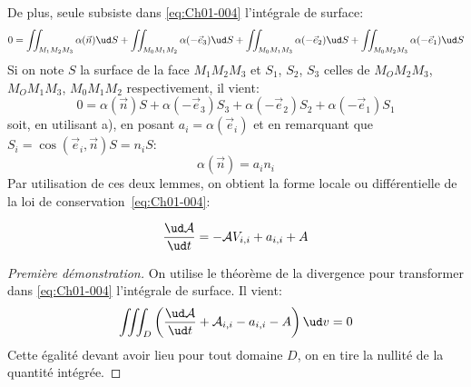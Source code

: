 De plus, seule subsiste dans \eqref{eq:Ch01-004} l'intégrale de surface:
\begin{equation*}
    0=\iint_{M_1M_2M_3}\alpha(\vec{n}) \ud S+\iint_{M_0M_1M_2}\alpha(-\vec{e}_3) \ud S+ \iint_{M_0M_1M_3}\alpha(-\vec{e}_2) \ud S+\iint_{M_0M_2M_3}\alpha(-\vec{e}_1) \ud S
\end{equation*}
Si on note $S$ la surface de la face $M_1M_2M_3$ et $S_1$, $S_2$, $S_3$ celles de $M_OM_2M_3$, $M_OM_1M_3$, $M_0M_1M_2$ respectivement, il vient:
\begin{equation*}
    0 = \alpha(\vec{n})S+\alpha(-\vec{e}_3)S_3+\alpha(-\vec{e}_2)S_2+\alpha(-\vec{e}_1)S_1
\end{equation*}
soit, en utilisant a), en posant $a_i=\alpha(\vec{e}_i)$ et en remarquant que $S_i=\cos(\vec{e}_i,\vec{n})S=n_iS$:
\begin{equation*}
    \alpha(\vec{n})=a_in_i
\end{equation*}
Par utilisation de ces deux lemmes, on obtient la forme locale ou différentielle de la loi de conservation~\eqref{eq:Ch01-004}:
\begin{thm}
    \begin{equation}
        \frac{\ud \mathcal{A}}{\ud t} = -\mathcal{A}V_{i,i} + a_{i,i} + A
        \label{eq:Ch01-008}
    \end{equation}
    \label{thm:Ch01-1}
\end{thm}
\begin{proof}[Première démonstration]
    On utilise le théorème de la divergence pour transformer dans \eqref{eq:Ch01-004} l'intégrale de surface.
    Il vient:
    \begin{equation*}
        \iiint_D\left(\frac{\ud \mathcal{A}}{\ud t}+\mathcal{A}_{i,i}-a_{i,i}-A\right)\ud v=0
    \end{equation*}
    Cette égalité devant avoir lieu pour tout domaine $D$, on en tire la nullité de la quantité intégrée.
\end{proof}

